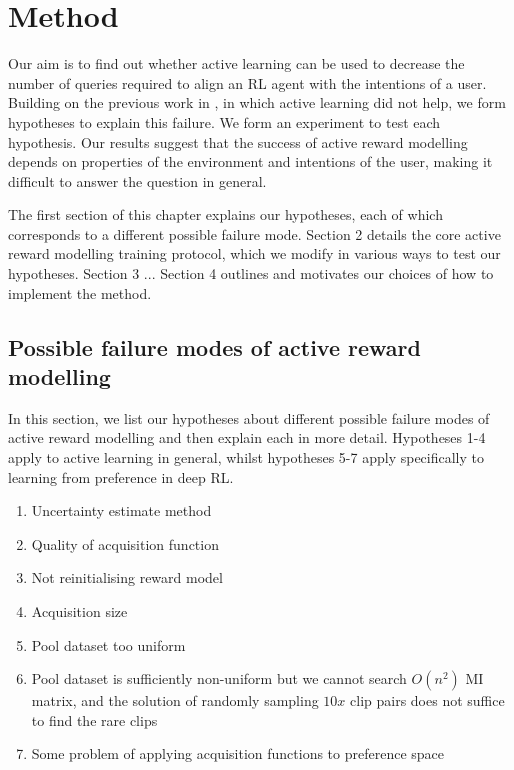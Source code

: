 \documentclass[11pt, a4paper, bibliography=totoc]{report}
\begin{document}
\chapter{Method}
Our aim is to find out whether active learning can be used to decrease the number of queries required to align an RL agent with the intentions of a user. Building on the previous work in \cite{Christiano2017}, in which active learning did not help, we form hypotheses to explain this failure. We form an experiment to test each hypothesis. Our results suggest that the success of active reward modelling depends on properties of the environment and intentions of the user, making it difficult to answer the question in general.

The first section of this chapter explains our hypotheses, each of which corresponds to a different possible failure mode. Section 2 details the core active reward modelling training protocol, which we modify in various ways to test our hypotheses. Section 3 ... Section 4 outlines and motivates our choices of how to implement the method.

\section{Possible failure modes of active reward modelling} \label{sec:failure}
In this section, we list our hypotheses about different possible failure modes of active reward modelling and then explain each in more detail. Hypotheses 1-4 apply to active learning in general, whilst hypotheses 5-7 apply specifically to learning from preference in deep RL.
\begin{enumerate} %
	\item Uncertainty estimate method
	\item Quality of acquisition function
	\item Not reinitialising reward model
    \item Acquisition size
	\item Pool dataset too uniform
	\item Pool dataset is sufficiently non-uniform but we cannot search $ O(n^2) $ MI matrix, and the solution of randomly sampling $ 10x $ clip pairs does not suffice to find the rare clips
	\item Some problem of applying acquisition functions to preference space
\end{enumerate}
\end{document}

